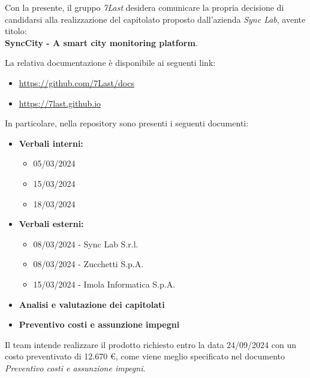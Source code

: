 \documentclass[italian,12pt]{article} %
\begin{document}


\newpage



Con la presente, il gruppo \textit{7Last} desidera comunicare la propria decisione di candidarsi alla realizzazione
del capitolato proposto dall'azienda \textit{Sync Lab}, avente titolo: \\ \textbf{SyncCity - A smart city monitoring 
platform}.


La relativa documentazione è disponibile ai seguenti link:
\begin{itemize}
        \item\textcolor{blue}{\url{https://github.com/7Last/docs}}
    \item\textcolor{blue}{\url{https://7last.github.io}}
\end{itemize}


In particolare, nella repository sono presenti i seguenti documenti:
\begin{itemize}
	\item{\textbf{Verbali interni:}}
		\begin{itemize}
			\item{05/03/2024}
			\item{15/03/2024}
			\item{18/03/2024}
		\end{itemize}

	\item{\textbf{Verbali esterni:}}
		\begin{itemize}
			\item{08/03/2024 - Sync Lab S.r.l.}
			\item{08/03/2024 - Zucchetti S.p.A.}
			\item{15/03/2024 - Imola Informatica S.p.A.}
		\end{itemize}
	
	\item{\textbf{Analisi e valutazione dei capitolati}}
	\item{\textbf{Preventivo costi e assunzione impegni}}
\end{itemize}

\vspace{8pt}

Il team intende realizzare il prodotto richiesto entro la data 24/09/2024 con un costo preventivato di 12.670 €,
come viene meglio specificato nel documento \textit{Preventivo costi e assunzione impegni}.

\vspace{8pt}
\end{document}
